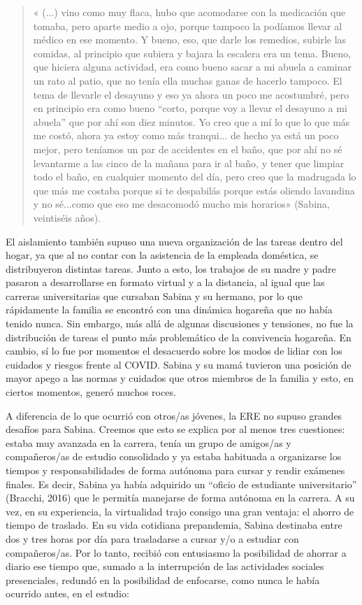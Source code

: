 \begin{quote}
« (...) vino como muy flaca, hubo que acomodarse con la medicación que tomaba, pero aparte medio a ojo, porque tampoco la podíamos llevar al médico en ese momento. Y bueno, eso, que darle los remedios, subirle las comidas, al principio que subiera y bajara la escalera era un tema. Bueno, que hiciera alguna actividad, era como bueno sacar a mi abuela a caminar un rato al patio, que no tenía ella muchas ganas de hacerlo tampoco. El tema de llevarle el desayuno y eso ya ahora un poco me acostumbré, pero en principio era como bueno ``corto, porque voy a llevar el desayuno a mi abuela'' que por ahí son diez minutos. Yo creo que a mí lo que lo que más me costó, ahora ya estoy como más tranqui... de hecho ya está un poco mejor, pero teníamos un par de accidentes en el baño, que por ahí no sé levantarme a las cinco de la mañana para ir al baño, y tener que limpiar todo el baño, en cualquier momento del día, pero creo que la madrugada lo que más me costaba porque si te despabilás porque estás oliendo lavandina y no sé...como que eso me desacomodó mucho mis horarios» (Sabina, veintiséis años).
\end{quote}

El aislamiento también supuso una nueva organización de las tareas dentro del hogar, ya que al no contar con la asistencia de la empleada doméstica, se distribuyeron distintas tareas. Junto a esto, los trabajos de su madre y padre pasaron a desarrollarse en formato virtual y a la distancia, al igual que las carreras universitarias que cursaban Sabina y su hermano, por lo que rápidamente la familia se encontró con una dinámica hogareña que no había tenido nunca. Sin embargo, más allá de algunas discusiones y tensiones, no fue la distribución de tareas el punto más problemático de la convivencia hogareña. En cambio, sí lo fue por momentos el desacuerdo sobre los modos de lidiar con los cuidados y riesgos frente al COVID. Sabina y su mamá tuvieron una posición de mayor apego a las normas y cuidados que otros miembros de la familia y esto, en ciertos momentos, generó muchos roces.

A diferencia de lo que ocurrió con otros/as jóvenes, la ERE no supuso grandes desafíos para Sabina. Creemos que esto se explica por al menos tres cuestiones: estaba muy avanzada en la carrera, tenía un grupo de amigos/as y compañeros/as de estudio consolidado y ya estaba habituada a organizarse los tiempos y responsabilidades de forma autónoma para cursar y rendir exámenes finales. Es decir, Sabina ya había adquirido un ``oficio de estudiante universitario'' (Bracchi, 2016) que le permitía manejarse de forma autónoma en la carrera. A su vez, en su experiencia, la virtualidad trajo consigo una gran ventaja: el ahorro de tiempo de traslado. En su vida cotidiana prepandemia, Sabina destinaba entre dos y tres horas por día para trasladarse a cursar y/o a estudiar con compañeros/as. Por lo tanto, recibió con entusiasmo la posibilidad de ahorrar a diario ese tiempo que, sumado a la interrupción de las actividades sociales presenciales, redundó en la posibilidad de enfocarse, como nunca le había ocurrido antes, en el estudio:

